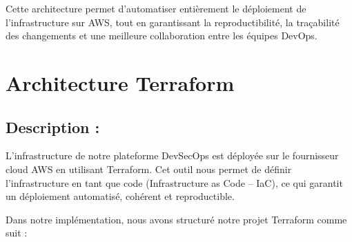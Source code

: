 Cette architecture permet d’automatiser entièrement le déploiement de l’infrastructure sur AWS, tout en garantissant la reproductibilité, la traçabilité des changements et une meilleure collaboration entre les équipes DevOps.
\section{Architecture Terraform}

\subsection{Description :}

L’infrastructure de notre plateforme DevSecOps est déployée sur le fournisseur cloud AWS en utilisant Terraform. Cet outil nous permet de définir l’infrastructure en tant que code (Infrastructure as Code – IaC), ce qui garantit un déploiement automatisé, cohérent et reproductible.

Dans notre implémentation, nous avons structuré notre projet Terraform comme suit :

